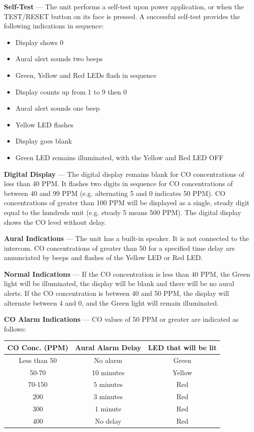 \textbf{Self-Test} --- The unit performs a self-test upon power application, or when the TEST/RESET button on its face is pressed. A successful self-test provides the following indications in sequence:
\begin{itemize}
\item Display shows 0 
\item Aural alert sounds two beeps 
\item Green, Yellow and Red LEDs flash in sequence 
\item Display counts up from 1 to 9 then 0 
\item Aural alert sounds one beep 
\item Yellow LED flashes 
\item Display goes blank 
\item Green LED remains illuminated, with the Yellow and Red LED OFF 
\end{itemize}
\textbf{Digital Display} --- The digital display remains blank for CO concentrations of less than 40 PPM. It flashes two digits in sequence for CO concentrations of between 40 and 99 PPM (e.g. alternating 5 and 0 indicates 50 PPM). CO concentrations of greater than 100 PPM will be displayed as a single, steady digit equal to the hundreds unit (e.g. steady 5 means 500 PPM). The digital display shows the CO level without delay.

\textbf{Aural Indications} --- The unit has a built-in speaker. It is not connected to the intercom. CO concentrations of greater than 50 for a specified time delay are annunciated by beeps and flashes of the Yellow LED or Red LED.


\textbf{Normal Indications} --- If the CO concentration is less than 40 PPM, the Green light will be illuminated, the display will be blank and there will be no aural alerts. If the CO concentration is between 40 and 50 PPM, the display will alternate between 4 and 0, and the Green light will remain illuminated.

\begin{minipage}{\textwidth}
\textbf{CO Alarm Indications} --- CO values of 50 PPM or greater are indicated as follows:
\begin{center}
\begin{tabular}
{|c|c|c|} \hline CO Conc. (PPM) & Aural Alarm Delay& LED that will be lit\tabularnewline \hline \hline Less than 50 & No alarm& Green\tabularnewline \hline 50-70& 10 minutes & Yellow\tabularnewline \hline 70-150 & 5 minutes& Red\tabularnewline \hline 200& 3 minutes & Red\tabularnewline \hline 300& 1 minute& Red\tabularnewline \hline 400& No delay & Red\tabularnewline \hline 
\end{tabular}
\end{center}
\end{minipage}

